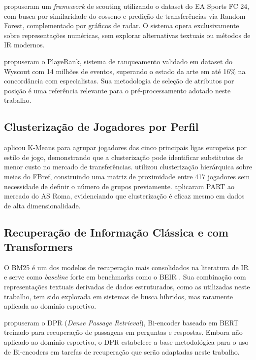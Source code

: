 \documentclass[portuguese]{sbc2025}
\begin{document}
\citet{researchgate2025} propuseram um \textit{framework} de scouting utilizando o
dataset do EA Sports FC 24, com busca por similaridade do cosseno e predição de
transferências via Random Forest, complementado por gráficos de radar. O sistema opera
exclusivamente sobre representações numéricas, sem explorar alternativas textuais ou
métodos de IR modernos.

\citet{playerank2019} propuseram o PlayeRank, sistema de ranqueamento validado em
dataset do Wyscout com 14 milhões de eventos, superando o estado da arte em até 16\%
na concordância com especialistas. Sua metodologia de seleção de atributos por posição
é uma referência relevante para o pré-processamento adotado neste trabalho.

\subsection{Clusterização de Jogadores por Perfil}

\citet{oconnor2023} aplicou K-Means para agrupar jogadores das cinco principais ligas
europeias por estilo de jogo, demonstrando que a clusterização pode identificar
substitutos de menor custo no mercado de transferências. \citet{carey2020} utilizou
clusterização hierárquica sobre meias do FBref, construindo uma matriz de proximidade
entre 417 jogadores sem necessidade de definir o número de grupos previamente.
\citet{aimsciences2018} aplicaram PART ao mercado do AS Roma, evidenciando que
clusterização é eficaz mesmo em dados de alta dimensionalidade.

\subsection{Recuperação de Informação Clássica e com Transformers}

O BM25 é um dos modelos de recuperação mais consolidados na literatura de IR
\citep{robertson2009} e serve como \textit{baseline} forte em benchmarks como o BEIR
\citep{thakur2021}. Sua combinação com representações textuais derivadas de dados
estruturados, como as utilizadas neste trabalho, tem sido explorada em sistemas de
busca híbridos, mas raramente aplicada ao domínio esportivo.

\citet{karpukhin2020} propuseram o DPR (\textit{Dense Passage Retrieval}), Bi-encoder
baseado em BERT treinado para recuperação de passagens em perguntas e respostas. Embora
não aplicado ao domínio esportivo, o DPR estabelece a base metodológica para o uso de
Bi-encoders em tarefas de recuperação que serão adaptadas neste trabalho.
\end{document}
